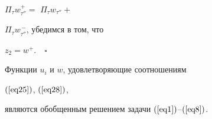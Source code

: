 $\Pi_{\tau} w_{\tau''}^{+}=$ $\Pi_{\tau} w_{\tau''}+$


$\Pi_{\tau} w_{\tau''}^{\,-}$, убедимся в том, что


$z_{2}=w^{+}.\quad\square$





\begin{lem}


Функции $u_{i}$ и $w$, удовлетворяющие соотношениям


$(\ref{eq25})$, $(\ref{eq28})$,


являются обобщенным решением задачи $(\ref{eq1})$--$(\ref{eq8})$.


\label{l5}


\end{lem}





